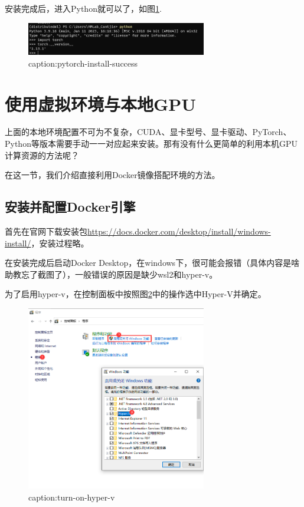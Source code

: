 安装完成后，进入Python就可以了，如图\ref{fig:pytorch-install-success}.

\begin{figure}[htbp]
	\centering
	\includegraphics[width=0.7\textwidth]{figures/pytorch-install-success.png}
	\caption{caption:pytorch-install-success}
	\label{fig:pytorch-install-success}
\end{figure}





\section{使用虚拟环境与本地GPU}

上面的本地环境配置不可为不复杂，CUDA、显卡型号、显卡驱动、PyTorch、Python等版本需要手动一一对应起来安装。那有没有什么更简单的利用本机GPU计算资源的方法呢？

在这一节，我们介绍直接利用Docker镜像搭配环境的方法。

\subsection{安装并配置Docker引擎}

首先在官网下载安装包\url{https://docs.docker.com/desktop/install/windows-install/}，安装过程略。

在安装完成后启动Docker Desktop，在windows下，很可能会报错（具体内容是啥助教忘了截图了），一般错误的原因是缺少wsl2和hyper-v。

为了启用hyper-v，在控制面板中按照图\ref{fig:turn-on-hyper-v}中的操作选中Hyper-V并确定。
\begin{figure}[htbp]
	\centering
	\includegraphics[width=0.7\textwidth]{figures/turn-on-hyper-v.png}
	\caption{caption:turn-on-hyper-v}
	\label{fig:turn-on-hyper-v}
\end{figure}

